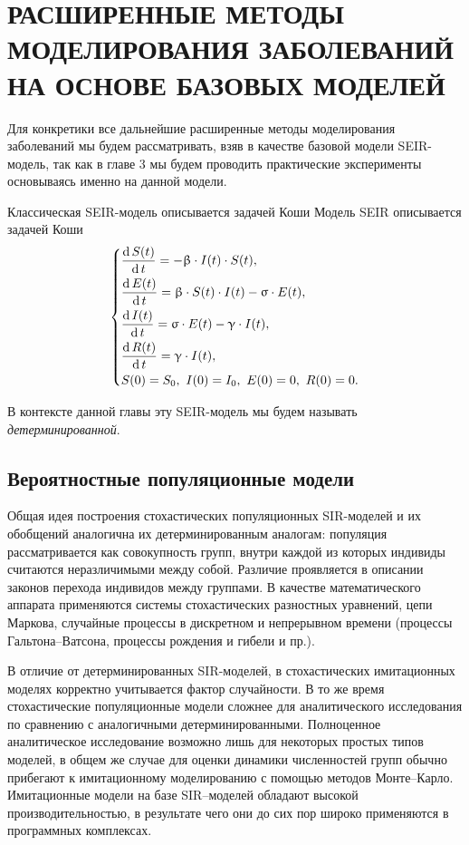 \documentclass[a4paper, 14pt]{extreport}
\renewcommand{\beta}{\upbeta}
\renewcommand{\gamma}{\upgamma}
\renewcommand{\sigma}{\upsigma}
\renewcommand{\d}{\operatorname{d}}
\begin{document}
	
	\newpage
	\chapter{РАСШИРЕННЫЕ МЕТОДЫ МОДЕЛИРОВАНИЯ ЗАБОЛЕВАНИЙ НА ОСНОВЕ БАЗОВЫХ МОДЕЛЕЙ}
	Для конкретики все дальнейшие расширенные методы моделирования заболеваний мы будем рассматривать, взяв в качестве базовой модели SEIR-модель, так как в главе 3 мы будем проводить практические эксперименты основываясь именно на данной модели. 
	
	Классическая SEIR-модель описывается задачей Коши
	Модель SEIR описывается задачей Коши
	\begin{equation*}
		\begin{dcases}
			\dfrac {\d S(t)}{\d t} = - \beta \cdot I(t)\cdot S(t),\\
			\dfrac {\d E(t)}{\d t} = \beta \cdot S(t)\cdot I(t) - \sigma\cdot E(t),\\
			\dfrac{\d I(t)}{\d t} =\sigma \cdot E(t) - \gamma\cdot I(t),\\
			\dfrac{\d R(t)}{\d t} = \gamma\cdot I(t),\\
			S(0) = S_0,\ I(0) = I_0,\ E(0) = 0,\ R(0) = 0.
		\end{dcases}
	\end{equation*}
	
	В контексте данной главы эту SEIR-модель мы будем называть \textit{детерминированной}.
	\section{Вероятностные популяционные модели}
	Общая идея построения стохастических популяционных SIR-моделей и их обобщений аналогична их детерминированным аналогам:
	популяция рассматривается как совокупность групп, внутри каждой из которых
	индивиды считаются неразличимыми между собой. Различие проявляется в
	описании законов перехода индивидов между группами. В качестве
	математического аппарата применяются системы стохастических разностных
	уравнений, цепи Маркова, случайные процессы в дискретном и непрерывном
	времени (процессы Гальтона–Ватсона, процессы рождения и гибели и пр.). 
	
	В отличие от детерминированных SIR-моделей, в стохастических имитационных моделях корректно учитывается
	фактор случайности. В то же время стохастические популяционные модели
	сложнее для аналитического исследования по сравнению с аналогичными
	детерминированными. Полноценное аналитическое исследование возможно
	лишь для некоторых простых типов моделей, в общем же случае для оценки
	динамики численностей групп обычно прибегают к имитационному
	моделированию с помощью методов Монте–Карло. Имитационные модели на
	базе SIR–моделей обладают высокой производительностью, в результате чего
	они до сих пор широко применяются в программных комплексах.
	
\end{document}

